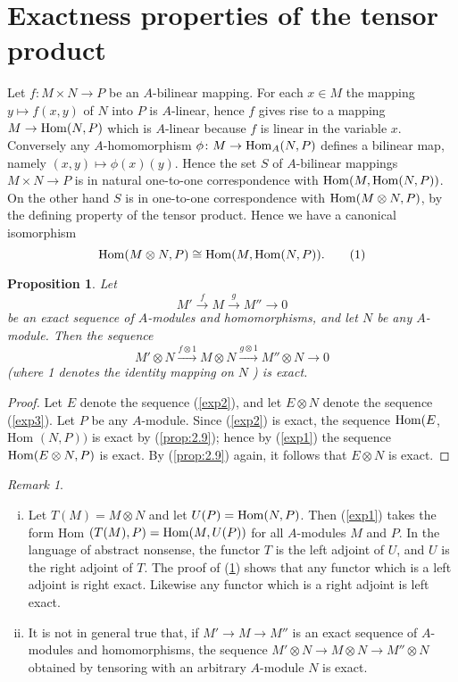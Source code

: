 \documentclass{standalone}
\newtheorem{proposition}[theorem]{Proposition}
\theoremstyle{definition}
\theoremstyle{remark}
\newtheorem*{remark}{Remark}
\begin{document}
\section{Exactness properties of the tensor product}
Let $f\colon M \times N \to P$ be an $A$-bilinear mapping. For each $x \in M$ the
mapping $y \mapsto f(x, y)$ of $N$ into $P$ is $A$-linear, hence $f$ gives rise
to a mapping $M \to\operatorname{Hom}(N, P)$ which is $A$-linear because $f$ is linear in
the variable $x$. Conversely any $A$-homomorphism $\phi\colon M \to \operatorname{Hom}_{A}(N, P)$
defines a bilinear map, namely $(x, y) \mapsto \phi(x)(y)$. Hence the set $S$ of
$A$-bilinear mappings $M \times N \to P$ is in natural one-to-one correspondence
with $\operatorname{Hom}(M, \operatorname{Hom}(N, P))$. On the other hand $S$ is in one-to-one
correspondence with $\operatorname{Hom}(M \otimes N, P)$, by the defining property of the
tensor product. Hence we have a canonical isomorphism
\begin{equation}
  \label{exp1}
  \operatorname{Hom}(M \otimes N, P) \cong \operatorname{Hom}(M, \operatorname{Hom}(N, P)).\tag{1}
\end{equation}
\begin{proposition}
  \label{prop:2.18}
  Let
  \begin{equation}
    \label{exp2}
  M' \stackrel{f}{\to} M \stackrel{g}{\to} M'' \to 0\tag{2}
  \end{equation}
be an exact sequence of $A$-modules and homomorphisms, and let $N$ be any
$A$-module. Then the sequence
\begin{equation}
  \label{exp3}
  M' \otimes N \stackrel{f \otimes 1}{\longrightarrow} M \otimes N \stackrel{g \otimes 1}{\longrightarrow} M'' \otimes N \to 0
\end{equation}
(where 1 denotes the identity mapping on $N$ ) is exact.
\end{proposition}
\begin{proof}
  Let $E$ denote the sequence (\ref{exp2}), and let $E \otimes N$ denote the
sequence (\ref{exp3}). Let $P$ be any $A$-module. Since (\ref{exp2}) is exact, the sequence
$\operatorname{Hom}(E$, Hom $(N, P))$ is exact by (\ref{prop:2.9}); hence by (\ref{exp1}) the sequence
$\operatorname{Hom}(E \otimes N, P)$ is exact. By (\ref{prop:2.9}) again, it follows
that $E \otimes N$ is exact.
\end{proof}
\begin{remark}
\begin{enumerate}[i)]
\item Let $T(M)=M \otimes N$ and let $U(P)=\operatorname{Hom}(N, P)$. Then (\ref{exp1}) takes the
form Hom $(T(M), P)=\operatorname{Hom}(M, U(P))$ for all $A$-modules $M$ and $P$. In the
language of abstract nonsense, the functor $T$ is the left adjoint of $U$, and
$U$ is the right adjoint of $T$. The proof of (\ref{prop:2.18}) shows that any functor
which is a left adjoint is right exact. Likewise any functor which is a right
adjoint is left exact.
\item It is not in general true that, if $M' \to M \to M''$
is an exact sequence of $A$-modules and homomorphisms, the sequence
$M' \otimes N \to M \otimes N \to M'' \otimes N$ obtained by tensoring with an
arbitrary $A$-module $N$ is exact.
\end{enumerate}
\end{remark}
\end{document}
